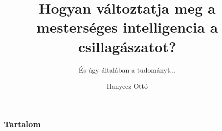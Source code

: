 \documentclass{beamer}
\title[MI a csillagászatban]{Hogyan változtatja meg a mesterséges intelligencia a csillagászatot?}
\subtitle{És úgy általában a tudományt...}
\author{Hanyecz Ottó}
\date[MTT, \today]
{
\begin{columns}
    \begin{column}{0.9\textwidth}
        \centering
        \begin{Large}
            Polaris Csillagvizsgáló \\
        \end{Large}
        \vspace*{0.5cm}
        Budapest \\
        \vspace*{0.5cm}
        2020. október 26.
    \end{column}
\end{columns}
}
\begin{document}
\begin{frame}
    \titlepage
\end{frame}

\begin{frame}
    \frametitle{Tartalom}
    \tableofcontents
\end{frame}


\end{document}

